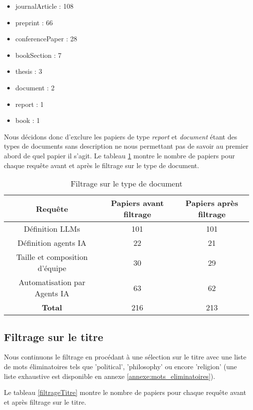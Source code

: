 \begin{itemize}
    \item journalArticle : 108
    \item preprint : 66
    \item conferencePaper : 28
    \item bookSection : 7
    \item thesis : 3
    \item document : 2
    \item report : 1
    \item book : 1
\end{itemize}

Nous décidons donc d'exclure les papiers de type \textit{report} et \textit{document} étant des types de documents sans description ne nous permettant pas de savoir au premier abord de quel papier il s'agit.
Le tableau \ref{filtrageTypeDoc} montre le nombre de papiers pour chaque requête avant et après le filtrage sur le type de document.

\begin{table}[H]
\centering
\begin{tabular}{|c|c|c|}
  \hline
  \textbf{Requête} & \textbf{Papiers avant filtrage} & \textbf{Papiers après filtrage}\\
  \hline
  Définition LLMs & 101 & 101 \\
  \hline
  Définition agents IA & 22 & 21 \\
  \hline
  Taille et composition d'équipe & 30 & 29 \\
  \hline
  Automatisation par Agents IA & 63 & 62 \\
  \hline
  \textbf{Total} & 216 & 213 \\
  \hline
\end{tabular}
\caption{Filtrage sur le type de document}
\label{filtrageTypeDoc}
\end{table}

\subsection{Filtrage sur le titre}

Nous continuons le filtrage en procédant à une sélection sur le titre avec une liste de mots éliminatoires tels que 'political', 'philosophy' ou encore 'religion' (une liste exhaustive est disponible en annexe \ref{annexe:mots_eliminatoires}).

Le tableau \ref{filtrageTitre} montre le nombre de papiers pour chaque requête avant et après filtrage sur le titre.


